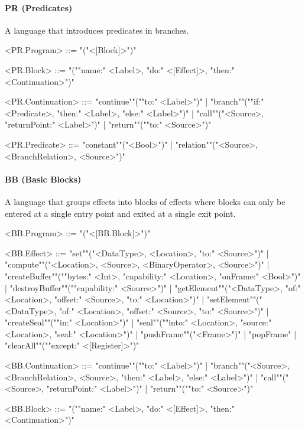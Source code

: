 \documentclass[main.tex]{subfiles}
\begin{document}
\paragraph{ PR (Predicates) } A language that introduces predicates in branches.
\begin{grammar}
	\footnotesize
				<PR.Program> ::=
							"("<[Block]>")"
				\par
				<PR.Block> ::=
							"(""name:" <Label>, "do:" <[Effect]>, "then:" <Continuation>")"
				\par
				<PR.Continuation> ::=
						"continue""(""to:" <Label>")"
						| "branch""(""if:" <Predicate>, "then:" <Label>, "else:" <Label>")"
						| "call""("<Source>, "returnPoint:" <Label>")"
						| "return""(""to:" <Source>")"
				\par
				<PR.Predicate> ::=
						"constant""("<Bool>")"
						| "relation""("<Source>, <BranchRelation>, <Source>")"
				\par
\end{grammar}
\par
\paragraph{ BB (Basic Blocks) } A language that groups effects into blocks of effects where blocks can only be entered at a single entry point and exited at a single exit point.
\begin{grammar}
	\footnotesize
				<BB.Program> ::=
							"("<[BB.Block]>")"
				\par
				<BB.Effect> ::=
						"set""("<DataType>, <Location>, "to:" <Source>")"
						| "compute""("<Location>, <Source>, <BinaryOperator>, <Source>")"
						| "createBuffer""(""bytes:" <Int>, "capability:" <Location>, "onFrame:" <Bool>")"
						| "destroyBuffer""(""capability:" <Source>")"
						| "getElement""("<DataType>, "of:" <Location>, "offset:" <Source>, "to:" <Location>")"
						| "setElement""("<DataType>, "of:" <Location>, "offset:" <Source>, "to:" <Source>")"
						| "createSeal""(""in:" <Location>")"
						| "seal""(""into:" <Location>, "source:" <Location>, "seal:" <Location>")"
						| "pushFrame""("<Frame>")"
						| "popFrame"
						| "clearAll""(""except:" <[Register]>")"
				\par
				<BB.Continuation> ::=
						"continue""(""to:" <Label>")"
						| "branch""("<Source>, <BranchRelation>, <Source>, "then:" <Label>, "else:" <Label>")"
						| "call""("<Source>, "returnPoint:" <Label>")"
						| "return""(""to:" <Source>")"
				\par
				<BB.Block> ::=
							"(""name:" <Label>, "do:" <[Effect]>, "then:" <Continuation>")"
				\par
\end{grammar}
\par
\end{document}
